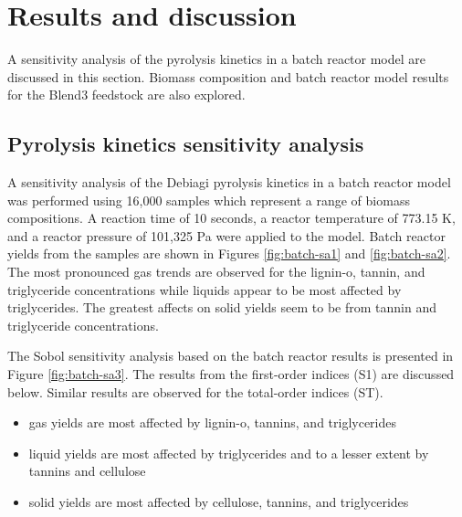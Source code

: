 
\section{Results and discussion}

A sensitivity analysis of the pyrolysis kinetics in a batch reactor model are discussed in this section. Biomass composition and batch reactor model results for the Blend3 feedstock are also explored.

\subsection{Pyrolysis kinetics sensitivity analysis}

A sensitivity analysis of the Debiagi pyrolysis kinetics in a batch reactor model was performed using 16,000 samples which represent a range of biomass compositions. A reaction time of 10 seconds, a reactor temperature of 773.15 K, and a reactor pressure of 101,325 Pa were applied to the model. Batch reactor yields from the samples are shown in Figures \ref{fig:batch-sa1} and \ref{fig:batch-sa2}. The most pronounced gas trends are observed for the lignin-o, tannin, and triglyceride concentrations while liquids appear to be most affected by triglycerides. The greatest affects on solid yields seem to be from tannin and triglyceride concentrations.

The Sobol sensitivity analysis based on the batch reactor results is presented in Figure \ref{fig:batch-sa3}. The results from the first-order indices (S1) are discussed below. Similar results are observed for the total-order indices (ST).

\begin{itemize}
    \item gas yields are most affected by lignin-o, tannins, and triglycerides
    \item liquid yields are most affected by triglycerides and to a lesser extent by tannins and cellulose
    \item solid yields are most affected by cellulose, tannins, and triglycerides
\end{itemize}

